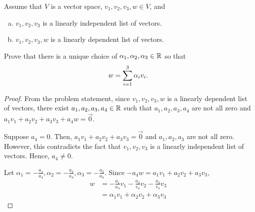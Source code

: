 \begin{question}
    \normalfont

    Assume that $V$ is a vector space, $v_1,v_2,v_3,w\in V$, and
    \begin{enumerate}[(a)]
        \item $v_1,v_2,v_3$ \hspace{.1cm} is a linearly independent list of vectors.
        \item $v_1,v_2,v_3,w$ \hspace{.1cm}  is a linearly dependent list of vectors.
    \end{enumerate}
    Prove that there is a unique choice of $\alpha_1,\alpha_2,\alpha_3\in{\mathbb R}$ so that
    \begin{align*}
        w=\sum_{i=1}^3 \alpha_iv_i.
    \end{align*}
\end{question}

\begin{proof}
    From the problem statement, since $v_1,v_2,v_3,w$ is a linearly dependent list of vectors, there exist $a_1,a_2,a_3,a_4\in\mathbb R$ such that $a_1,a_2,a_3,a_4$ are not all zero and $a_1v_1+a_2v_2+a_3v_3+a_4w=\vec{0}$.

    Suppose $a_4=0$. Then, $a_1v_1+a_2v_2+a_3v_3=\vec{0}$ and $a_1,a_2,a_3$ are not all zero. However, this contradicts the fact that $v_1,v_2,v_3$ is a linearly independent list of vectors. Hence, $a_4\not=0$.
    
    Let $\alpha_1=-\frac{a_1}{a_4},\alpha_2=-\frac{a_2}{a_4},\alpha_3=-\frac{a_3}{a_4}$. Since $-a_4w=a_1v_1+a_2v_2+a_3v_3$,
    \[
        \begin{aligned}
            w &= -\frac{a_1}{a_4}v_1-\frac{a_2}{v_4}v_2-\frac{a_3}{v_4}v_3\\    
              &= \alpha_1v_1+\alpha_2v_2+\alpha_3v_3
        \end{aligned}
    \]
\end{proof}